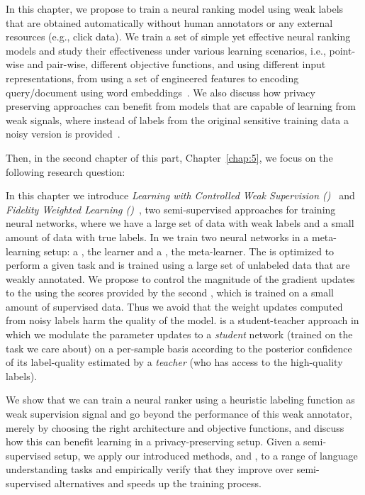 In this chapter, we propose to train a neural ranking model using weak labels that are obtained automatically without human annotators or any external resources (e.g., click data). We train a set of simple yet effective neural ranking models and study their effectiveness under various learning scenarios, i.e., point-wise and pair-wise, different objective functions, and using different input representations, from using a set of engineered features to encoding query/document using word embeddings~\citep{Dehghani:2017:SIGIR}. We also discuss how privacy preserving approaches can benefit from models that are capable of learning from weak signals, where instead of labels from the original sensitive training data a noisy version is provided~\citep{dehghani:2017:neuir}.

Then, in the second chapter of this part, Chapter~\ref{chap:5}, we focus on the following research question:

In this chapter we introduce \emph{Learning with Controlled Weak Supervision (\cws)}~\cite{Dehghani:2017:nips_metalearn, Dehghani:2017avoiding} and \emph{Fidelity Weighted Learning (\fwl)}~\citep{dehghani:2018:ICLR,Dehghani:2019:ICLR-LLD}, two semi-supervised approaches for training neural networks, where we have a large set of data with weak labels and a small amount of data with true labels. 
%
In \cws we train two neural networks in a meta-learning setup: a \tnet, the learner and a \cnet, the meta-learner.  The \tnet is optimized to perform a given task and is trained using a large set of unlabeled data that are weakly annotated. We propose to control the magnitude of the gradient updates to the \tnet using the scores provided by the second \cnet, which is trained on a small amount of supervised data. Thus we avoid that the weight updates computed from noisy labels harm the quality of the \tnet model.
%
\fwl is a student-teacher approach in which we modulate the parameter updates to a \emph{student} network (trained on the task we care about) on a per-sample basis according to the posterior confidence of its label-quality estimated by a \emph{teacher} (who has access to the high-quality labels).  


We show that we can train a neural ranker using a heuristic labeling function as weak supervision signal and go beyond the performance of this weak annotator, merely by choosing the right architecture and objective functions, and discuss how this can benefit learning in a privacy-preserving setup.
Given a semi-supervised setup, we apply our introduced methods, \cws and \fwl, to a range of language understanding tasks and empirically verify that they improve over semi-supervised alternatives and speeds up the training process. 

\medskip


